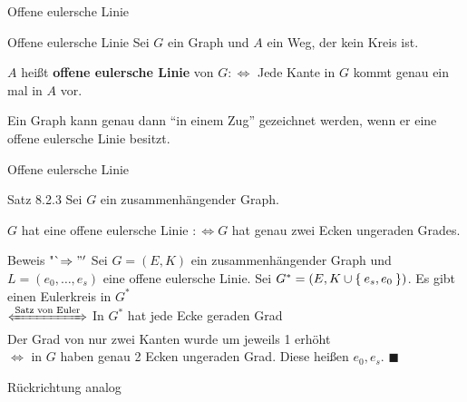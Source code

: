 \begin{frame}{Offene eulersche Linie}
\begin{block}{Offene eulersche Linie}
Sei $G$ ein Graph und $A$ ein Weg, der kein Kreis ist.

$A$ heißt \textbf{offene eulersche Linie} von $G :\Leftrightarrow$ Jede Kante 
in $G$ kommt genau ein mal in $A$ vor.
\end{block}

Ein Graph kann genau dann "`in einem Zug"' gezeichnet werden, wenn er eine 
offene eulersche Linie besitzt.
\end{frame}

\begin{frame}{Offene eulersche Linie}
\begin{block}{Satz 8.2.3}
Sei $G$ ein zusammenhängender Graph.

$G$ hat eine offene eulersche Linie $:\Leftrightarrow G$ hat genau zwei Ecken 
ungeraden Grades.
\end{block}

\pause

\begin{block}{Beweis "`$\Rightarrow"'$}
Sei $G=(E, K)$ ein zusammenhängender Graph und $L = (e_0, \dots, e_s)$ eine offene
eulersche Linie. \pause
Sei $G^* = (E, K \cup \Set{e_s, e_0})$. \pause
Es gibt einen Eulerkreis in $G^*$ \pause \\
$\xLeftrightarrow{\text{Satz von Euler}}$ In $G^*$ hat jede Ecke geraden Grad \pause \\
Der Grad von nur zwei Kanten wurde um jeweils 1 erhöht \pause \\
$\Leftrightarrow$ in $G$ haben genau 2 Ecken ungeraden Grad. Diese heißen $e_0, e_s$. $\blacksquare$
\end{block}

\pause
Rückrichtung analog
\end{frame}

